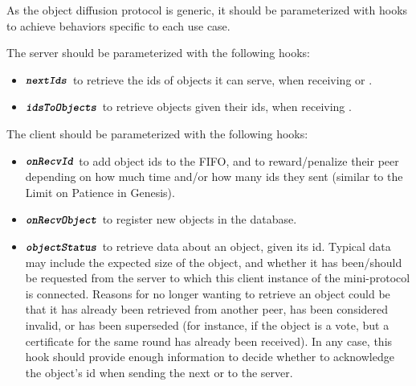 As the object diffusion protocol is generic, it should be parameterized with hooks to achieve behaviors specific to each use case.

The server should be parameterized with the following hooks:
\begin{itemize}
  \item $\textbf{\texttt{\textit{nextIds}}}$ to retrieve the ids of objects it can serve, when receiving \MsgRequestObjIdsB{} or \MsgRequestObjIdsNB{}.
  \item $\textbf{\texttt{\textit{idsToObjects}}}$ to retrieve objects given their ids, when receiving \MsgRequestObjs{}.
\end{itemize}

The client should be parameterized with the following hooks:
\begin{itemize}
  \item $\textbf{\texttt{\textit{onRecvId}}}$ to add object ids to the FIFO, and to reward/penalize their peer depending on how much time and/or how many ids they sent (similar to the Limit on Patience in Genesis). 
  \item $\textbf{\texttt{\textit{onRecvObject}}}$ to register new objects in the database.
  \item $\textbf{\texttt{\textit{objectStatus}}}$ to retrieve data about an object, given its id.
  Typical data may include the expected size of the object, and whether it has been/should be requested from the server to which this client instance of the mini-protocol is connected.
  Reasons for no longer wanting to retrieve an object could be that it has already been retrieved from another peer, has been considered invalid, or has been superseded (for instance, if the object is a vote, but a certificate for the same round has already been received).
  In any case, this hook should provide enough information to decide whether to acknowledge the object's id when sending the next \MsgRequestObjIdsB{} or \MsgRequestObjIdsNB{} to the server.
\end{itemize}


